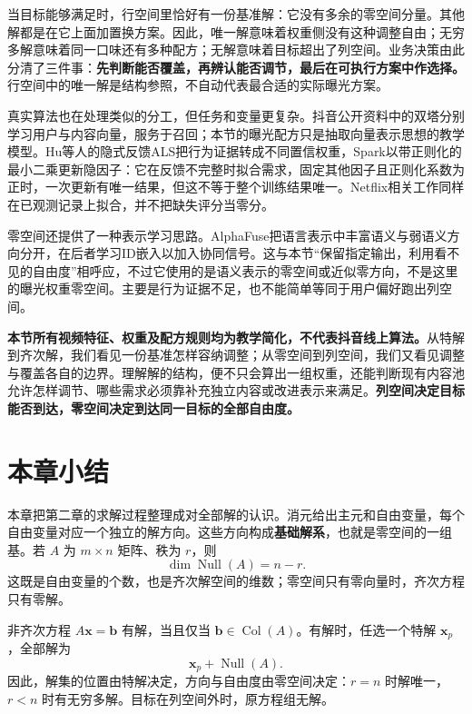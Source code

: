 \documentclass[a4paper,12pt,twoside,openany,fontset=none]{ctexbook}
\numberwithin{equation}{chapter}
\begin{document}
当目标能够满足时，行空间里恰好有一份基准解：它没有多余的零空间分量。其他解都是在它上面加置换方案。因此，唯一解意味着权重侧没有这种调整自由；无穷多解意味着同一口味还有多种配方；无解意味着目标超出了列空间。业务决策由此分清了三件事：\textbf{先判断能否覆盖，再辨认能否调节，最后在可执行方案中作选择。}行空间中的唯一解是结构参照，不自动代表最合适的实际曝光方案。

真实算法也在处理类似的分工，但任务和变量更复杂。抖音公开资料中的双塔分别学习用户与内容向量，服务于召回；本节的曝光配方只是抽取向量表示思想的教学模型。\cite{douyin-recommendation}Hu等人的隐式反馈ALS把行为证据转成不同置信权重，Spark以带正则化的最小二乘更新隐因子：它在反馈不完整时拟合需求，固定其他因子且正则化系数为正时，一次更新有唯一结果，但这不等于整个训练结果唯一。Netflix相关工作同样在已观测记录上拟合，并不把缺失评分当零分。\cite{hu-als-2008,spark-als-docs,koren-mf-2009}

零空间还提供了一种表示学习思路。AlphaFuse把语言表示中丰富语义与弱语义方向分开，在后者学习ID嵌入以加入协同信号。\cite{alphafuse-2025}这与本节“保留指定输出，利用看不见的自由度”相呼应，不过它使用的是语义表示的零空间或近似零方向，不是这里的曝光权重零空间。主要是行为证据不足，也不能简单等同于用户偏好跑出列空间。

\textbf{本节所有视频特征、权重及配方规则均为教学简化，不代表抖音线上算法。}从特解到齐次解，我们看见一份基准怎样容纳调整；从零空间到列空间，我们又看见调整与覆盖各自的边界。理解解的结构，便不只会算出一组权重，还能判断现有内容池允许怎样调节、哪些需求必须靠补充独立内容或改进表示来满足。\textbf{列空间决定目标能否到达，零空间决定到达同一目标的全部自由度。}
\endgroup

\clearpage
\section*{本章小结}

本章把第二章的求解过程整理成对全部解的认识。消元给出主元和自由变量，每个自由变量对应一个独立的解方向。这些方向构成\textbf{基础解系}，也就是零空间的一组基。若 $A$ 为 $m\times n$ 矩阵、秩为 $r$，则
\begin{equation*}
 \dim\operatorname{Null}(A)=n-r.
\end{equation*}
这既是自由变量的个数，也是齐次解空间的维数；零空间只有零向量时，齐次方程只有零解。

非齐次方程 $A\boldsymbol x=\boldsymbol b$ 有解，当且仅当 $\boldsymbol b\in\operatorname{Col}(A)$。有解时，任选一个特解 $\boldsymbol x_p$，全部解为
\begin{equation*}
 \boldsymbol x_p+\operatorname{Null}(A).
\end{equation*}
因此，解集的位置由特解决定，方向与自由度由零空间决定：$r=n$ 时解唯一，$r<n$ 时有无穷多解。目标在列空间外时，原方程组无解。
\end{document}
